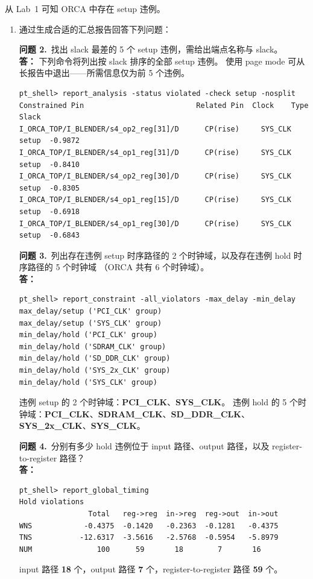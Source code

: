 从 Lab~1 可知 ORCA 中存在 setup 违例。

\begin{enumerate}
  \item 通过生成合适的汇总报告回答下列问题：

\begin{questionBox}
\textbf{问题 2.}\ 找出 slack 最差的 5 个 setup 违例，需给出端点名称与 slack。\\[0.35em]
\textbf{答：} 下列命令将列出按 slack 排序的全部 setup 违例。
使用 page mode 可从长报告中退出——所需信息仅为前 5 个违例。
\begin{lstlisting}
pt_shell> report_analysis -status violated -check setup -nosplit
Constrained Pin                          Related Pin  Clock    Type   Slack
I_ORCA_TOP/I_BLENDER/s4_op2_reg[31]/D      CP(rise)     SYS_CLK  setup  -0.9872
I_ORCA_TOP/I_BLENDER/s4_op1_reg[31]/D      CP(rise)     SYS_CLK  setup  -0.8410
I_ORCA_TOP/I_BLENDER/s4_op2_reg[30]/D      CP(rise)     SYS_CLK  setup  -0.8305
I_ORCA_TOP/I_BLENDER/s4_op1_reg[15]/D      CP(rise)     SYS_CLK  setup  -0.6918
I_ORCA_TOP/I_BLENDER/s4_op1_reg[30]/D      CP(rise)     SYS_CLK  setup  -0.6843
\end{lstlisting}

\textbf{问题 3.}\ 列出存在违例 setup 时序路径的 2 个时钟域，以及存在违例 hold 时序路径的 5 个时钟域
（ORCA 共有 6 个时钟域）。\\[0.35em]
\textbf{答：}\\
\begin{lstlisting}
pt_shell> report_constraint -all_violators -max_delay -min_delay
max_delay/setup ('PCI_CLK' group)
max_delay/setup ('SYS_CLK' group)
min_delay/hold ('PCI_CLK' group)
min_delay/hold ('SDRAM_CLK' group)
min_delay/hold ('SD_DDR_CLK' group)
min_delay/hold ('SYS_2x_CLK' group)
min_delay/hold ('SYS_CLK' group)
\end{lstlisting}
违例 setup 的 2 个时钟域：\textbf{PCI\_CLK}、\textbf{SYS\_CLK}。
违例 hold 的 5 个时钟域：\textbf{PCI\_CLK}、\textbf{SDRAM\_CLK}、\textbf{SD\_DDR\_CLK}、\textbf{SYS\_2x\_CLK}、\textbf{SYS\_CLK}。

\textbf{问题 4.}\ 分别有多少 hold 违例位于 input 路径、output 路径，以及 register-to-register 路径？\\[0.35em]
\textbf{答：}\\
\begin{lstlisting}
pt_shell> report_global_timing
Hold violations
                Total   reg->reg  in->reg  reg->out  in->out
WNS            -0.4375  -0.1420   -0.2363  -0.1281   -0.4375
TNS           -12.6317  -3.5616   -2.5768  -0.5954   -5.8979
NUM               100      59       18        7       16
\end{lstlisting}
input 路径 \textbf{18} 个，output 路径 \textbf{7} 个，register-to-register 路径 \textbf{59} 个。
\end{questionBox}


\end{enumerate}
